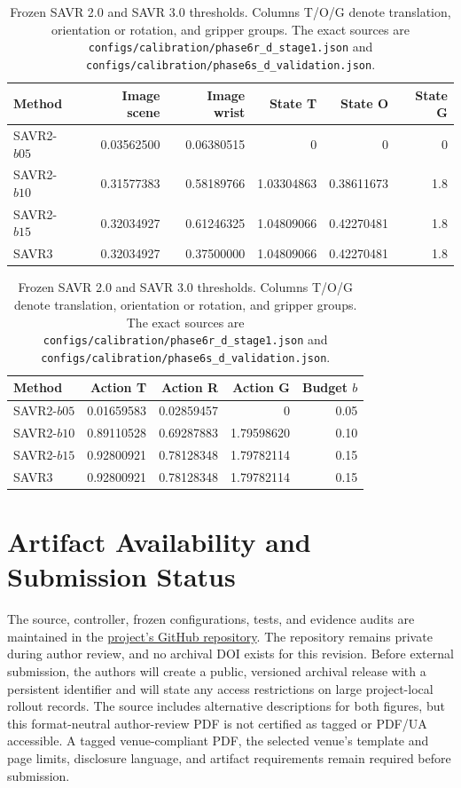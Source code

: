 \documentclass[11pt]{article}
\begin{document}
\begin{table}[H]
\centering
\scriptsize
\caption{Frozen SAVR 2.0 and SAVR 3.0 thresholds. Columns T/O/G denote translation, orientation or rotation, and gripper groups. The exact sources are \nolinkurl{configs/calibration/phase6r_d_stage1.json} and \nolinkurl{configs/calibration/phase6s_d_validation.json}.}
\label{tab:redesignthresholds}
\begin{tabular}{lrrrrr}
\toprule
Method & Image scene & Image wrist & State T & State O & State G \\
\midrule
SAVR2-$b05$ & 0.03562500 & 0.06380515 & 0 & 0 & 0 \\
SAVR2-$b10$ & 0.31577383 & 0.58189766 & 1.03304863 & 0.38611673 & 1.8 \\
SAVR2-$b15$ & 0.32034927 & 0.61246325 & 1.04809066 & 0.42270481 & 1.8 \\
SAVR3 & 0.32034927 & 0.37500000 & 1.04809066 & 0.42270481 & 1.8 \\
\bottomrule
\end{tabular}

\vspace{0.45em}

\begin{tabular}{lrrrr}
\toprule
Method & Action T & Action R & Action G & Budget $b$ \\
\midrule
SAVR2-$b05$ & 0.01659583 & 0.02859457 & 0 & 0.05 \\
SAVR2-$b10$ & 0.89110528 & 0.69287883 & 1.79598620 & 0.10 \\
SAVR2-$b15$ & 0.92800921 & 0.78128348 & 1.79782114 & 0.15 \\
SAVR3 & 0.92800921 & 0.78128348 & 1.79782114 & 0.15 \\
\bottomrule
\end{tabular}
\end{table}

\section{Artifact Availability and Submission Status}

The source, controller, frozen configurations, tests, and evidence audits are maintained in the \href{https://github.com/vwdr/SAVR}{project's GitHub repository}. The repository remains private during author review, and no archival DOI exists for this revision. Before external submission, the authors will create a public, versioned archival release with a persistent identifier and will state any access restrictions on large project-local rollout records. The source includes alternative descriptions for both figures, but this format-neutral author-review PDF is not certified as tagged or PDF/UA accessible. A tagged venue-compliant PDF, the selected venue's template and page limits, disclosure language, and artifact requirements remain required before submission.
\end{document}

